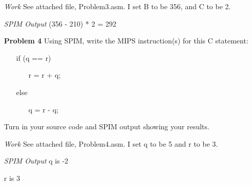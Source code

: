 \documentclass[12pt]{article}
\begin{document}
\begin{enumerate}
  \item[\textit{Work}] See attached file, Problem3.asm. I set B to be 356, and C to be 2.
  \item[\textit{SPIM Output}] (356 - 210) * 2 = 292
\end{enumerate}




\begin{enumerate}
  \item[\textbf{Problem 4}] Using SPIM, write the MIPS instruction(s) for this C statement:
  \begin{enumerate}\ttfamily
    \item[] if  (q == r)
    \begin{enumerate}
      \item[] r = r + q;
    \end{enumerate}
    \item[] else
    \begin{enumerate}
      \item[] q = r - q;
    \end{enumerate}
  \end{enumerate}
	\item[]Turn in your source code and SPIM output showing your results.
\end{enumerate}

\begin{enumerate}
  \item[\textit{Work}] See attached file, Problem4.asm. I set q to be 5 and r to be 3.
  \item[\textit{SPIM Output}] q is -2
  \item[] r is 3
\end{enumerate}
\end{document}
